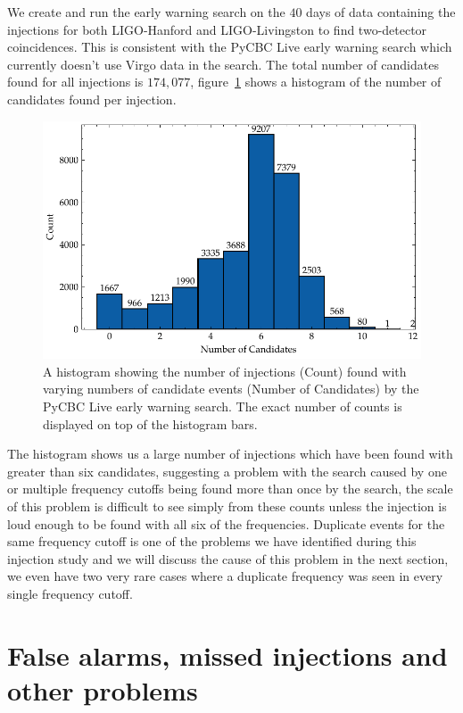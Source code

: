 We create and run the early warning search on the $40$ days of data containing the injections for both LIGO-Hanford and LIGO-Livingston to find two-detector coincidences. This is consistent with the PyCBC Live early warning search which currently doesn't use Virgo data in the search. The total number of candidates found for all injections is $174,077$, figure~\ref{6:fig:cand_hist} shows a histogram of the number of candidates found per injection.
%
\begin{figure}
    \centering
    \includegraphics[width=1.0\linewidth]{images/6_earlywarning/results/count_histogram.pdf}
    \caption{A histogram showing the number of injections (Count) found with varying numbers of candidate events (Number of Candidates) by the PyCBC Live early warning search. The exact number of counts is displayed on top of the histogram bars.}
    \label{6:fig:cand_hist}
\end{figure}
%
The histogram shows us a large number of injections which have been found with greater than six candidates, suggesting a problem with the search caused by one or multiple frequency cutoffs being found more than once by the search, the scale of this problem is difficult to see simply from these counts unless the injection is loud enough to be found with all six of the frequencies. Duplicate events for the same frequency cutoff is one of the problems we have identified during this injection study and we will discuss the cause of this problem in the next section, we even have two very rare cases where a duplicate frequency was seen in every single frequency cutoff.

\section{\label{6:sec:identified-problems}False alarms, missed injections and other problems}

